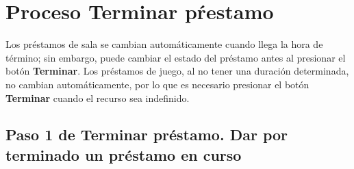 \chapter{Proceso Terminar pŕestamo}
	Los préstamos de sala se cambian automáticamente cuando llega la hora 
	de término; sin embargo, puede cambiar el estado del préstamo antes
	al presionar el botón \textbf{Terminar}. Los préstamos de juego, al 
	no tener una duración determinada, no cambian automáticamente, por lo que es necesario presionar  el botón \textbf{Terminar} cuando el 
	recurso sea indefinido.

\section{Paso 1 de Terminar préstamo. 
	Dar por terminado un préstamo en curso}
	
